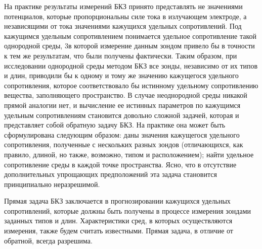 На практике результаты измерений БКЗ принято представлять не значениями
потенциалов, которые пропорциональны силе тока в излучающем электроде, а
независящими от тока значениями кажущихся удельных сопротивлений. Под кажущимся
удельным сопротивлением понимается удельное сопротивление такой однородной среды,
3в которой измерение данным зондом привело бы в точности к тем же результатам, что были
получены фактически. Таким образом, при исследовании однородной среды методом БКЗ
все зонды, независимо от их типов и длин, приводили бы к одному и тому же значению
кажущегося удельного сопротивления, которое соответствовало бы истинному удельному
сопротивлению вещества, заполняющего пространство. В случае неоднородной среды
никакой прямой аналогии нет, и вычисление ее истинных параметров по кажущимся
удельным сопротивлениям становится довольно сложной задачей, которая и представляет
собой обратную задачу БКЗ. На практике она может быть сформулирована следующим
образом: даны значения кажущегося удельного сопротивления, полученные с нескольких
разных зондов (отличающихся, как правило, длиной, но также, возможно, типом и
расположением); найти удельное сопротивление среды в каждой точке пространства. Ясно,
что в отсутствие дополнительных упрощающих предположений эта задача становится
принципиально неразрешимой.

Прямая задача БКЗ заключается в
прогнозировании кажущихся удельных сопротивлений, которые должны быть получены в
процессе измерения зондами заданных типов и длин. Характеристики сред, в которых
осуществляются измерения, также будем считать известными. Прямая задача, в отличие от
обратной, всегда разрешима.

\clearpage
